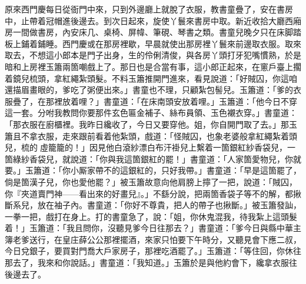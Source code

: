 原來西門慶每日從衙門中來，只到外邊廳上就脫了衣服，教書童疊了，安在書房中，止帶着冠帽進後邊去。到次日起來，旋使丫鬟來書房中取。{}新近收拾大廳西廂房一間做書房，內安床几、桌椅、屏幃、筆硯、琴書之類。書童兒晚夕只在床脚踏板上鋪着鋪睡。西門慶或在那房裡歇，早晨就使出那房裡丫鬟來前邊取衣服。取來取去，不想這小郎本是門子出身，生的伶俐清俊，與各房丫頭打牙犯嘴慣熟，於是暗和上房裡玉簫兩箇嘲戲上了。那日也是合當有事，這小郎正起來，在窻戶臺上擱着鏡兒梳頭，拿紅繩紮頭髮。不料玉簫推開門進來，看見說道：「好賊囚，你這咱還描眉畫眼的，爹吃了粥便出來。」書童也不理，只顧紮包髻兒。玉簫道：「爹的衣服疊了，在那裡放着哩？」書童道：「在床南頭安放着哩。」玉簫道：「他今日不穿這一套。分咐我教問你要那件玄色匾金補子、絲布員領、玉色襯衣穿。」書童道：「那衣服在廚櫃裡。我昨日纔收了，今日又要穿他。姐，你自開門取了去。」那玉簫且不拿衣服，走來跟前看着他紮頭，戲道：「怪賊囚，也象老婆般拿紅繩紮着頭兒，梳的𩬆虛籠籠的！」{}因見他白滾紗漂白布汗褂兒上繫着一箇銀紅紗香袋兒，一箇綠紗香袋兒，就說道：「你與我這箇銀紅的罷！」書童道：「人家箇愛物兒，你就要。」玉簫道：「你小厮家帶不的這銀紅的，只好我帶。」{}書童道：「早是這箇罷了，倘是箇漢子兒，你也愛他罷？」{}被玉簫故意向他肩膀上擰了一把，說道：「賊囚，你『夾道賣門神——看出來的好畫兒』。」不繇分說，把兩箇香袋子等不的解，都揪斷系兒，放在袖子內。{}書童道：「你好不尊貴，把人的帶子也揪斷。」被玉簫發訕，一拳一把，戲打在身上。打的書童急了，說：「姐，你休鬼混我，待我紮上這頭髮着！」玉簫道：「我且問你，沒聽見爹今日往那去？」書童道：「爹今日與縣中華主簿老爹送行，在皇庄薛公公那裡擺酒，來家只怕要下午時分，又聽見會下應二叔，今日兌銀子，要買對門喬大戶家房子，那裡吃酒罷了。」玉簫道：「等住回，你休往那去了，我來和你說話。」書童道：「我知道。」玉簫於是與他約會下，纔拿衣服往後邊去了。

